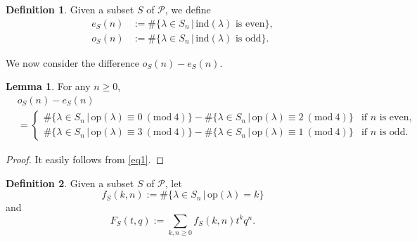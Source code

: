 \documentclass[reqno]{amsart}
\theoremstyle{definition}
\newtheorem{defn}{Definition}%
\newtheorem{lem}{Lemma}%
\newcommand{\ind}{\mathrm{ind}}
\newcommand{\op}{\mathrm{op}}
\newcommand{\pa}{\mathcal{P}}
\newcommand{\lam}{\lambda}
\newcommand{\Mod}[1]{\ (\mathrm{mod}\ #1)}
\begin{document}
\begin{defn}
Given a subset $S$ of $\pa$, we define
\begin{align*}
    e_{S}(n)&:= \# \{\lam\in S_n \, |\,   \mbox{$\ind(\lam)$ is even}\},\\
    o_{S} (n)&:=\# \{\lam\in S_n \, |\,   \mbox{$\ind(\lam)$ is odd}\}.
\end{align*}
\end{defn}

We now consider the difference $o_{S}(n)-e_{S}(n)$. 
\begin{lem}  \label{lem1}
For any $n\ge 0$,
\begin{align*}
& o_S(n)-e_{S}(n) \\
&=\begin{cases}
\# \{\lam\in S_n \, |\,  \op(\lam) \equiv 0 \Mod{4}\}   -  \# \{\lam\in S_n \, |\,  \op(\lam) \equiv 2 \Mod{4}\} &\mbox{if $n$ is even,}\\ 
\# \{\lam\in S_n \, |\,  \op(\lam) \equiv 3 \Mod{4}\} - \# \{\lam\in S_n \, |\,  \op(\lam) \equiv 1 \Mod{4}\}  & \mbox{if $n$ is odd}.
\end{cases}
\end{align*}
\end{lem}

\begin{proof}
It easily follows from \eqref{eq1}.
\end{proof}

\begin{defn} \label{def:fF}
Given a subset $S$ of $\pa$, let 
$$ 
f_S (k,n):=\#\{\lam\in S_n \, |\,  \op(\lam)=k \}$$
and
$$
F_S (t,q):=\sum_{k,n\ge 0} f_S(k,n)t^k q^n.
$$
\end{defn}
\end{document}
